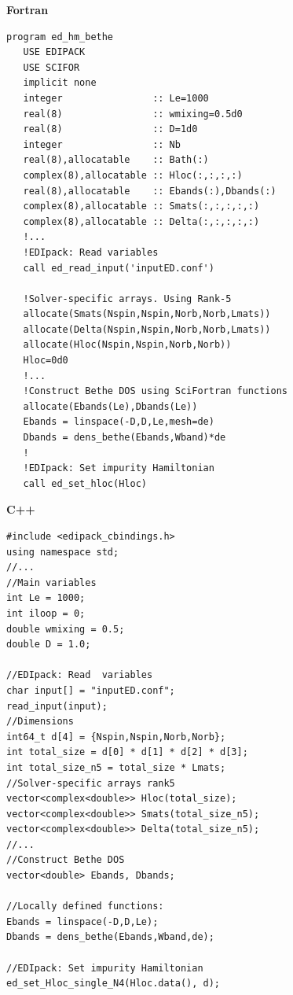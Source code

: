 \documentclass[edipack_sp.tex]{subfiles}
\begin{document}
\begin{center}
\begin{minipage}[t]{0.49\linewidth}
\textbf{Fortran}
\begin{lstlisting}[style=fstyle,frame=none,numbers=none,basicstyle={\scriptsize\ttfamily}]
program ed_hm_bethe
   USE EDIPACK
   USE SCIFOR
   implicit none
   integer                :: Le=1000
   real(8)                :: wmixing=0.5d0
   real(8)                :: D=1d0
   integer                :: Nb
   real(8),allocatable    :: Bath(:)
   complex(8),allocatable :: Hloc(:,:,:,:)
   real(8),allocatable    :: Ebands(:),Dbands(:)
   complex(8),allocatable :: Smats(:,:,:,:,:)
   complex(8),allocatable :: Delta(:,:,:,:,:)
   !...  
   !EDIpack: Read variables
   call ed_read_input('inputED.conf')
   
   !Solver-specific arrays. Using Rank-5  
   allocate(Smats(Nspin,Nspin,Norb,Norb,Lmats))
   allocate(Delta(Nspin,Nspin,Norb,Norb,Lmats))
   allocate(Hloc(Nspin,Nspin,Norb,Norb))
   Hloc=0d0
   !...
   !Construct Bethe DOS using SciFortran functions
   allocate(Ebands(Le),Dbands(Le))
   Ebands = linspace(-D,D,Le,mesh=de)
   Dbands = dens_bethe(Ebands,Wband)*de
   !
   !EDIpack: Set impurity Hamiltonian
   call ed_set_hloc(Hloc)
\end{lstlisting}
\end{minipage}
%
\begin{minipage}[t]{0.49\linewidth}
\textbf{C++}
\begin{lstlisting}[style=cstyle,frame=none,numbers=none,basicstyle={\scriptsize\ttfamily}]
#include <edipack_cbindings.h>
using namespace std;
//...
//Main variables
int Le = 1000;
int iloop = 0;
double wmixing = 0.5;
double D = 1.0;

//EDIpack: Read  variables    
char input[] = "inputED.conf"; 
read_input(input);      
//Dimensions
int64_t d[4] = {Nspin,Nspin,Norb,Norb};
int total_size = d[0] * d[1] * d[2] * d[3];
int total_size_n5 = total_size * Lmats;    
//Solver-specific arrays rank5
vector<complex<double>> Hloc(total_size);
vector<complex<double>> Smats(total_size_n5);
vector<complex<double>> Delta(total_size_n5);
//...
//Construct Bethe DOS
vector<double> Ebands, Dbands;

//Locally defined functions:
Ebands = linspace(-D,D,Le);
Dbands = dens_bethe(Ebands,Wband,de);

//EDIpack: Set impurity Hamiltonian
ed_set_Hloc_single_N4(Hloc.data(), d);
\end{lstlisting}
\end{minipage}
\end{center}
\end{document}
